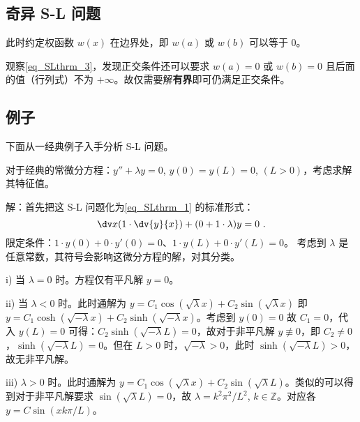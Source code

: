 \subsection{奇异 S-L 问题}
此时约定权函数 $w(x)$ 在边界处，即 $w(a)$ 或 $w(b)$ 可以等于 $0$。

观察\autoref{eq_SLthrm_3}，发现正交条件还可以要求 $w(a) = 0$ 或 $w(b) = 0$ 且后面的值（行列式）不为 $+\infty$。故仅需要解\textbf{有界}即可仍满足正交条件。



\subsection{例子}
下面从一经典例子入手分析 S-L 问题。

\begin{example}{}
对于经典的常微分方程：$y'' + \lambda y = 0$, $y(0) = y(L) = 0$, $(L > 0)$，考虑求解其特征值。
\end{example}
解：首先把这 S-L 问题化为\autoref{eq_SLthrm_1} 的标准形式：
$$\dv x (1 \cdot \dv{y}{x}) + (0 + 1 \cdot \lambda) y = 0~.$$
限定条件：$ 1\cdot y(0) + 0 \cdot y'(0) = 0$、$1 \cdot y(L) + 0 \cdot y'(L) = 0$。
考虑到 $\lambda$ 是任意常数，其符号会影响这微分方程的解，对其分类。

i) 当 $\lambda = 0$ 时。方程仅有平凡解 $y = 0$。

ii) 当 $\lambda < 0$ 时。此时通解为 $y = C_1 \cos(\sqrt{\lambda} x) + C_2 \sin(\sqrt{\lambda} x)$ 即 $y= C_1 \cosh(\sqrt{-\lambda} x) + C_2 \sinh(\sqrt{-\lambda} x)$。考虑到 $y(0)=0$ 故 $C_1 = 0$，代入 $y(L) = 0$ 可得：$C_2 \sinh(\sqrt{-\lambda} L) = 0$，故对于非平凡解 $y \not \equiv 0$，即 $C_2 \neq 0$，$\sinh(\sqrt{-\lambda} L) = 0$。但在 $L>0$ 时，$\sqrt{-\lambda} > 0$，此时 $\sinh(\sqrt{-\lambda} L) > 0$，故无非平凡解。

iii) $\lambda > 0$ 时。此时通解为 $y = C_1 \cos(\sqrt{\lambda} x) + C_2 \sin(\sqrt{\lambda} L)$。类似的可以得到对于非平凡解要求 $\sin(\sqrt \lambda L) = 0$，故 $\lambda = k^2 \pi^2/L^2$, $k \in \mathbb Z$。对应各 $y = C \sin(x k\pi/L )$。